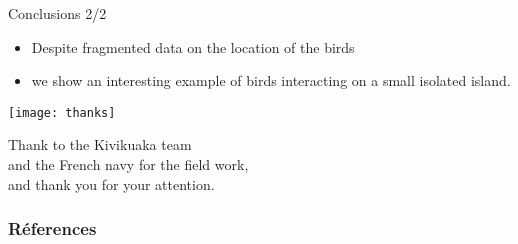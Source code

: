 \documentclass[10pt,compress]{beamer}
\begin{document}
\begin{frame}{Conclusions 2/2}
  \begin{itemize}
  \item Despite fragmented data on the location of the birds
  \item we show an interesting example of birds interacting on a small isolated island.
  \end{itemize}
\end{frame}



\begin{frame}[plain]
  \begin{center}
    \texttt{[image: thanks]} \\
    \vspace{6pt}
   
      Thank to the Kivikuaka team \\and the French navy
      for the field work, \\and thank you for your attention.
   
  \end{center}
\end{frame}


\begin{frame}[allowframebreaks]
  \begin{tiny}
    \frametitle{Réferences}
    
    
  \end{tiny}
\end{frame}
 
\end{document}
